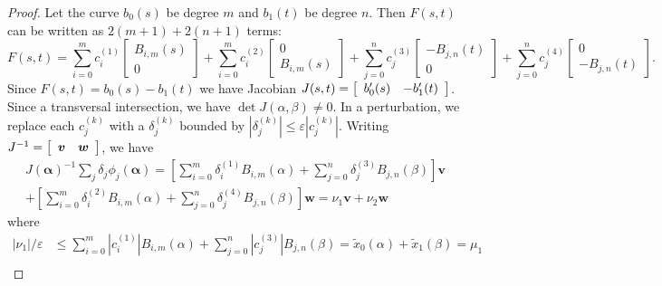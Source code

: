 \documentclass[3p, authoryear, square]{elsarticle}
\theoremstyle{definition}
\newcommand{\eps}{\varepsilon}
\begin{document}
\begin{proof}
Let the curve \(b_0(s)\) be degree \(m\) and \(b_1(t)\) be degree \(n\).
Then \(F(s, t)\) can be written as \(2(m + 1) + 2(n + 1)\) terms:
\begin{equation}
F(s, t) =
  \sum_{i = 0}^m c_i^{(1)} \left[ \begin{array}{c}
  B_{i, m}(s) \\ 0 \end{array}\right] +
  \sum_{i = 0}^m c_i^{(2)} \left[ \begin{array}{c}
  0 \\ B_{i, m}(s) \end{array}\right] +
  \sum_{j = 0}^n c_j^{(3)} \left[ \begin{array}{c}
  -B_{j, n}(t) \\ 0 \end{array}\right] +
  \sum_{j = 0}^n c_j^{(4)} \left[ \begin{array}{c}
  0 \\ -B_{j, n}(t) \end{array}\right].
\end{equation}
Since \(F(s, t) = b_0(s) - b_1(t)\) we have Jacobian \(J(s, t) =
\left[ \begin{array}{c c} b_0'(s) & -b_1'(t) \end{array}\right]\). Since
a transversal intersection, we have
\(\det J(\alpha, \beta) \neq 0\). In a perturbation, we replace each
\(c_j^{(k)}\) with a \(\delta_j^{(k)}\) bounded by
\(\left|\delta_j^{(k)}\right| \leq \eps \left|c_j^{(k)}\right|\).
Writing \(J^{-1} = \left[ \begin{array}{c c}
\bm{v} & \bm{w} \end{array}\right]\), we have
\begin{multline}
J\left(\bm{\alpha}\right)^{-1} \sum_j \delta_j
  \phi_j\left(\bm{\alpha}\right) =
  \left[\sum_{i = 0}^m \delta_i^{(1)} B_{i, m}(\alpha) +
  \sum_{j = 0}^n \delta_j^{(3)} B_{j, n}(\beta)\right] \bm{v} \\
  + \left[\sum_{i = 0}^m \delta_i^{(2)} B_{i, m}(\alpha) +
  \sum_{j = 0}^n \delta_j^{(4)} B_{j, n}(\beta)\right] \bm{w} =
  \nu_1 \bm{v} + \nu_2 \bm{w}
\end{multline}
where
\begin{align}
\left|\nu_1\right| / \eps &\leq \sum_{i = 0}^m
  \left|c_{i}^{(1)}\right| B_{i, m}\left(\alpha\right) + \sum_{j = 0}^n
  \left|c_{j}^{(3)}\right| B_{j, n}\left(\beta\right) =
  \widetilde{x}_0(\alpha) + \widetilde{x}_1(\beta) = \mu_1 \\

\end{align}
\end{proof}
\end{document}
